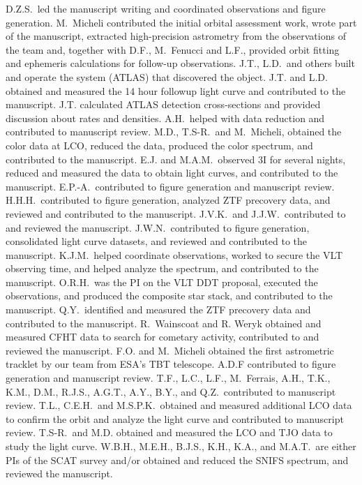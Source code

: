 \documentclass[linenumbers,twocolumn,longbib]{aastex7}
\begin{document}
\begin{contribution}


D.Z.S.\ led the manuscript writing and coordinated observations and figure generation.
M.\ Micheli contributed the initial orbital assessment work, wrote part of the manuscript, extracted high-precision astrometry from the observations of the team and, together with D.F., M.\ Fenucci and L.F., provided orbit fitting and ephemeris calculations for follow-up observations.
J.T., L.D.\ and others built and operate the system (ATLAS) that discovered the object. J.T. and L.D. obtained and measured the 14 hour followup light curve and contributed to the manuscript.  J.T.  calculated ATLAS detection cross-sections and provided discussion about rates and densities.
A.H.\ helped with data reduction and contributed to manuscript review.
M.D., T.S-R.\, and M.\ Micheli,  obtained the color data at LCO, reduced the data, produced the color spectrum, and contributed to the manuscript.
E.J. and M.A.M.\ observed 3I for several nights, reduced and measured the data to obtain light curves, and contributed to the manuscript.
E.P.-A.\ contributed to figure generation and manuscript review.
H.H.H.\ contributed to figure generation, analyzed ZTF precovery data, and reviewed and contributed to the manuscript.
J.V.K.\ and J.J.W.\ contributed to and reviewed the manuscript.
J.W.N.\ contributed to figure generation, consolidated light curve datasets, and reviewed and contributed to the manuscript.
K.J.M.\ helped coordinate observations, worked to secure the VLT observing time, and helped analyze the spectrum, and contributed to the manuscript.
O.R.H.\ was the PI on the VLT DDT proposal, executed the observations, and produced the composite star stack, and contributed to the manuscript.
Q.Y.\ identified and measured the ZTF precovery data and contributed to the manuscript.
R.\ Wainscoat and R. Weryk obtained and measured CFHT data to search for cometary activity, contributed to and reviewed the manuscript.
F.O. and M.\ Micheli obtained the first astrometric tracklet by our team from ESA's TBT telescope.
A.D.F contributed to figure generation and manuscript review.
T.F., L.C., L.F., M.\ Ferrais, A.H., T.K., K.M., D.M., R.J.S., A.G.T., A.Y., B.Y., and Q.Z.\ contributed to manuscript review.
T.L., C.E.H.\ and M.S.P.K.\ obtained and measured additional LCO data to confirm the orbit and analyze the light curve and contributed to manuscript review.
T.S-R.\ and M.D. obtained and measured the LCO and TJO data to study the light curve.
W.B.H., M.E.H., B.J.S., K.H., K.A., and M.A.T.\ are either PIs of the SCAT survey and/or obtained and reduced the SNIFS spectrum, and reviewed the manuscript.


\end{contribution}


\software{}

{}

\end{document}
